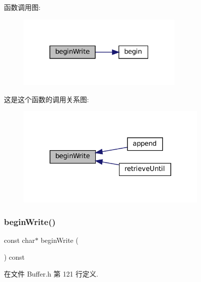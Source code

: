函数调用图\+:
\nopagebreak
\begin{figure}[H]
\begin{center}
\leavevmode
\includegraphics[width=229pt]{classmuduo_1_1Buffer_a71778facb9cd13bc2403edf59621f3f5_cgraph}
\end{center}
\end{figure}
这是这个函数的调用关系图\+:
\nopagebreak
\begin{figure}[H]
\begin{center}
\leavevmode
\includegraphics[width=263pt]{classmuduo_1_1Buffer_a71778facb9cd13bc2403edf59621f3f5_icgraph}
\end{center}
\end{figure}
\mbox{\label{classmuduo_1_1Buffer_a46f79eca290d4d4cee634e3c1b50c57d}} 
\subsubsection{\texorpdfstring{begin\+Write()}{beginWrite()}\hspace{0.1cm}{\footnotesize\ttfamily [2/2]}}
{\footnotesize\ttfamily const char$\ast$ begin\+Write (\begin{DoxyParamCaption}{ }\end{DoxyParamCaption}) const\hspace{0.3cm}{\ttfamily [inline]}}



在文件 Buffer.\+h 第 121 行定义.



